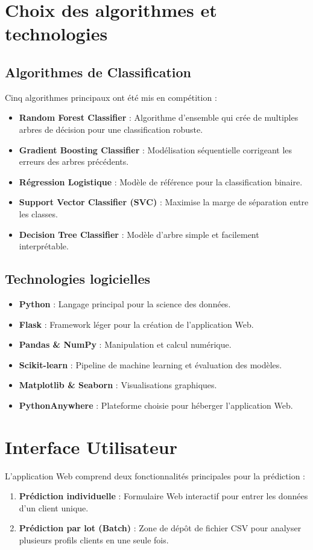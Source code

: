 \documentclass[a4paper,12pt]{report}
\begin{document}
\section{Choix des algorithmes et technologies}
\subsection{Algorithmes de Classification}
Cinq algorithmes principaux ont été mis en compétition :
\begin{itemize}
    \item \textbf{Random Forest Classifier} : Algorithme d'ensemble qui crée de multiples arbres de décision pour une classification robuste.
    \item \textbf{Gradient Boosting Classifier} : Modélisation séquentielle corrigeant les erreurs des arbres précédents.
    \item \textbf{Régression Logistique} : Modèle de référence pour la classification binaire.
    \item \textbf{Support Vector Classifier (SVC)} : Maximise la marge de séparation entre les classes.
    \item \textbf{Decision Tree Classifier} : Modèle d'arbre simple et facilement interprétable.
\end{itemize}

\subsection{Technologies logicielles}
\begin{itemize}
    \item \textbf{Python} : Langage principal pour la science des données.
    \item \textbf{Flask} : Framework léger pour la création de l'application Web.
    \item \textbf{Pandas \& NumPy} : Manipulation et calcul numérique.
    \item \textbf{Scikit-learn} : Pipeline de machine learning et évaluation des modèles.
    \item \textbf{Matplotlib \& Seaborn} : Visualisations graphiques.
    \item \textbf{PythonAnywhere} : Plateforme choisie pour héberger l'application Web.
\end{itemize}

\section{Interface Utilisateur}
L'application Web comprend deux fonctionnalités principales pour la prédiction :
\begin{enumerate}
    \item \textbf{Prédiction individuelle} : Formulaire Web interactif pour entrer les données d'un client unique.
    \item \textbf{Prédiction par lot (Batch)} : Zone de dépôt de fichier CSV pour analyser plusieurs profils clients en une seule fois.
\end{enumerate}
\end{document}
